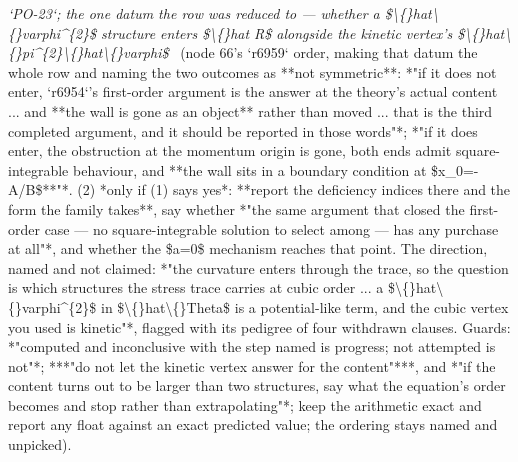 \begin{description}
\textit{`PO-23`; the one datum the row was reduced to --- whether a \$\textbackslash\{\}hat\textbackslash\{\}varphi\textasciicircum{}\{2\}\$ structure enters \$\textbackslash\{\}hat R\$ alongside the kinetic vertex's \$\textbackslash\{\}hat\textbackslash\{\}pi\textasciicircum{}\{2\}\textbackslash\{\}hat\textbackslash\{\}varphi\$} \ (node 66's `r6959` order, making that datum the whole row and naming the two outcomes as **not symmetric**: *"if it does not enter, `r6954`'s first-order argument is the answer at the theory's actual content ... and **the wall is gone as an object** rather than moved ... that is the third completed argument, and it should be reported in those words"*; *"if it does enter, the obstruction at the momentum origin is gone, both ends admit square-integrable behaviour, and **the wall sits in a boundary condition at \$x\_0=-A/B\$**"*. (2) *only if (1) says yes*: **report the deficiency indices there and the form the family takes**, say whether *"the same argument that closed the first-order case --- no square-integrable solution to select among --- has any purchase at all"*, and whether the \$a=0\$ mechanism reaches that point.  The direction, named and not claimed: *"the curvature enters through the trace, so the question is which structures the stress trace carries at cubic order ... a \$\textbackslash\{\}hat\textbackslash\{\}varphi\textasciicircum{}\{2\}\$ in \$\textbackslash\{\}hat\textbackslash\{\}Theta\$ is a potential-like term, and the cubic vertex you used is kinetic"*, flagged with its pedigree of four withdrawn clauses.  Guards: *"computed and inconclusive with the step named is progress; not attempted is not"*; ***"do not let the kinetic vertex answer for the content"***, and *"if the content turns out to be larger than two structures, say what the equation's order becomes and stop rather than extrapolating"*; keep the arithmetic exact and report any float against an exact predicted value; the ordering stays named and unpicked). 

\end{description}
